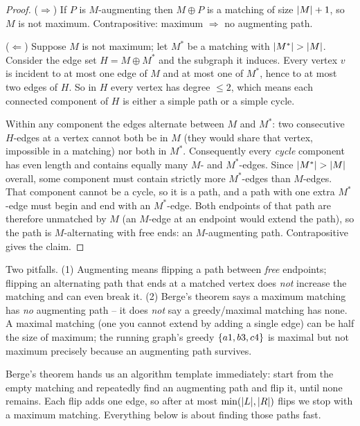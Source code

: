 \begin{proof}
($\Rightarrow$) If $P$ is $M$-augmenting then $M\oplus P$ is a matching of size
$\lvert M\rvert+1$, so $M$ is not maximum. Contrapositive: maximum $\Rightarrow$ no
augmenting path.

($\Leftarrow$) Suppose $M$ is not maximum; let $M^\ast$ be a matching with
$\lvert M^\ast\rvert>\lvert M\rvert$. Consider the edge set $H=M\oplus M^\ast$ and the subgraph
it induces. Every vertex $v$ is incident to at most one edge of $M$ and at most
one of $M^\ast$, hence to at most two edges of $H$. So in $H$ every vertex has
degree $\le 2$, which means each connected component of $H$ is either a simple
path or a simple cycle.

Within any component the edges alternate between $M$ and $M^\ast$: two
consecutive $H$-edges at a vertex cannot both be in $M$ (they would share that
vertex, impossible in a matching) nor both in $M^\ast$. Consequently every
\emph{cycle} component has even length and contains equally many $M$- and
$M^\ast$-edges. Since $\lvert M^\ast\rvert>\lvert M\rvert$ overall, some component must contain
strictly more $M^\ast$-edges than $M$-edges. That component cannot be a cycle, so
it is a path, and a path with one extra $M^\ast$-edge must begin and end with an
$M^\ast$-edge. Both endpoints of that path are therefore unmatched by $M$ (an
$M$-edge at an endpoint would extend the path), so the path is $M$-alternating
with free ends: an $M$-augmenting path. Contrapositive gives the claim.
\end{proof}

\begin{trapbox}
Two pitfalls. (1) Augmenting means flipping a path between \emph{free} endpoints;
flipping an alternating path that ends at a matched vertex does \emph{not}
increase the matching and can even break it. (2) Berge's theorem says a maximum
matching has \emph{no} augmenting path -- it does \emph{not} say a greedy/maximal
matching has none. A maximal matching (one you cannot extend by adding a single
edge) can be half the size of maximum; the running graph's greedy
$\{a1,b3,c4\}$ is maximal but not maximum precisely because an augmenting path
survives.
\end{trapbox}

Berge's theorem hands us an algorithm template immediately: start from the empty
matching and repeatedly find an augmenting path and flip it, until none remains.
Each flip adds one edge, so after at most $\min(\lvert L\rvert,\lvert R\rvert)$ flips we stop
with a maximum matching. Everything below is about finding those paths fast.

